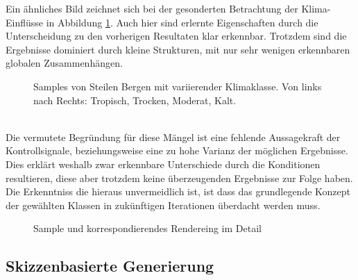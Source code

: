 Ein ähnliches Bild zeichnet sich bei der gesonderten Betrachtung der Klima-Einflüsse in Abbildung \ref{fig:unc_climate}. Auch hier sind erlernte Eigenschaften durch die Unterscheidung zu den vorherigen Resultaten klar erkennbar. Trotzdem sind die Ergebnisse dominiert durch kleine Strukturen, mit nur sehr wenigen erkennbaren globalen Zusammenhängen.
\begin{figure}[htbp]
    \centering
    \caption{Samples von Steilen Bergen mit variierender Klimaklasse. Von links nach Rechts: Tropisch, Trocken, Moderat, Kalt.}
    \label{fig:unc_climate}
\end{figure} \\
Die vermutete Begründung für diese Mängel ist eine fehlende Aussagekraft der Kontrollsignale, beziehungsweise eine zu hohe Varianz der möglichen Ergebnisse. Dies erklärt weshalb zwar erkennbare Unterschiede durch die Konditionen resultieren, diese aber trotzdem keine überzeugenden Ergebnisse zur Folge haben. Die Erkenntniss die hieraus unvermeidlich ist, ist dass das grundlegende Konzept der gewählten Klassen in zukünftigen Iterationen überdacht werden muss.  
\begin{figure}[htbp]
    \centering
    \caption{Sample und korrespondierendes Rendereing im Detail}
    \label{fig:unc_climate_renders}
\end{figure}


\subsection {Skizzenbasierte Generierung}

